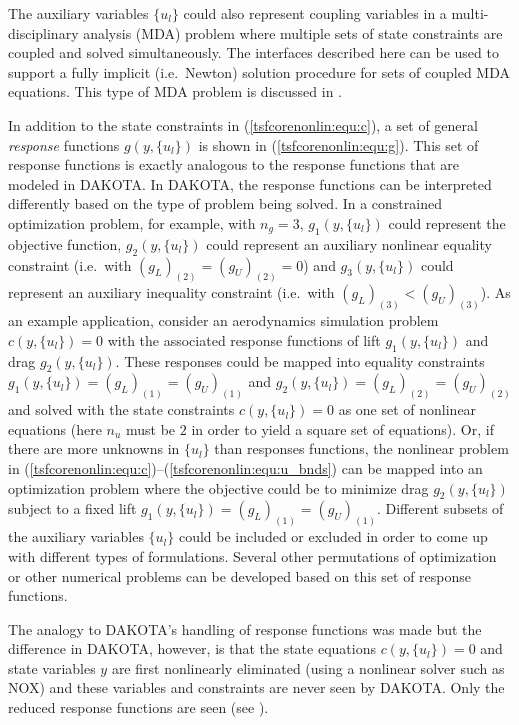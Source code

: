 The auxiliary variables $\{u_l\}$ could also represent coupling
variables in a multi-disciplinary analysis (MDA) problem where multiple
sets of state constraints are coupled and solved simultaneously.  The
interfaces described here can be used to support a fully implicit
(i.e.~Newton) solution procedure for sets of coupled MDA equations.
This type of MDA problem is discussed in \cite{ref:mds03,ref:mda_aiaa98}.

In addition to the state constraints in (\ref{tsfcorenonlin:equ:c}), a
set of general {\em response} functions $g(y,\{u_l\})$ is shown in
(\ref{tsfcorenonlin:equ:g}).  This set of response functions is
exactly analogous to the response functions that are modeled in
DAKOTA.  In DAKOTA, the response functions can be interpreted
differently based on the type of problem being solved.  In a
constrained optimization problem, for example, with $n_g = 3$,
$g_1(y,\{u_l\})$ could represent the objective function,
$g_2(y,\{u_l\})$ could represent an auxiliary nonlinear equality
constraint (i.e.~with $(g_L)_{(2)} = (g_U)_{(2)} = 0$) and
$g_3(y,\{u_l\})$ could represent an auxiliary inequality constraint
(i.e.~with $(g_L)_{(3)} < (g_U)_{(3)}$).  As an example application,
consider an aerodynamics simulation problem $c(y,\{u_l\}) = 0$
\cite{AJameson_1988} with the associated response functions of lift
$g_1(y,\{u_l\})$ and drag $g_2(y,\{u_l\})$.  These responses could be
mapped into equality constraints $g_1(y,\{u_l\}) = (g_L)_{(1)} =
(g_U)_{(1)}$ and $g_2(y,\{u_l\}) = (g_L)_{(2)} = (g_U)_{(2)}$ and
solved with the state constraints $c(y,\{u_l\}) = 0$ as one set of
nonlinear equations (here $n_u$ must be $2$ in order to yield a square
set of equations).  Or, if there are more unknowns in $\{u_l\}$ than
responses functions, the nonlinear problem in
(\ref{tsfcorenonlin:equ:c})--(\ref{tsfcorenonlin:equ:u_bnds}) can be
mapped into an optimization problem where the objective could be to
minimize drag $g_2(y,\{u_l\})$ subject to a fixed lift $g_1(y,\{u_l\})
= (g_L)_{(1)} = (g_U)_{(1)}$.  Different subsets of the auxiliary
variables $\{u_l\}$ could be included or excluded in order to come up
with different types of formulations.  Several other permutations of
optimization or other numerical problems can be developed based on
this set of response functions.

The analogy to DAKOTA's handling of response functions was made but
the difference in DAKOTA, however, is that the state equations
$c(y,\{u_l\}) = 0$ and state variables $y$ are first nonlinearly
eliminated (using a nonlinear solver such as NOX) and these variables
and constraints are never seen by DAKOTA.  Only the reduced response
functions are seen (see \cite[Charter 2]{ref:PDELDRD}).

